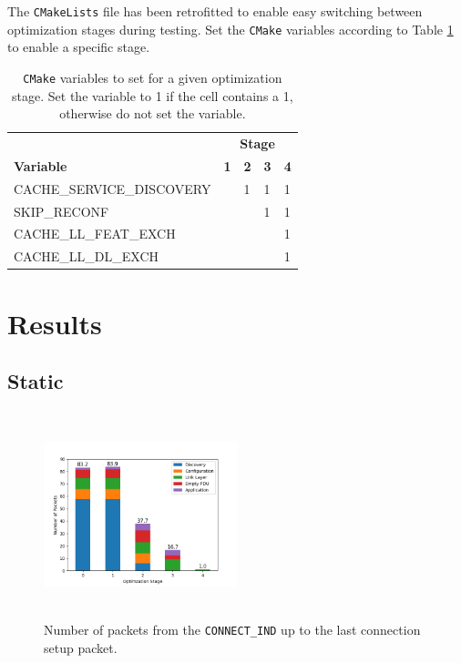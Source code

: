 The \texttt{CMakeLists} file has been retrofitted to enable easy switching between optimization stages during testing. Set the \texttt{CMake} variables according to Table \ref{tbl:stage_defs} to enable a specific stage.
\begin{table}
    \begin{center}
    \begin{tabular}{|l|l|l|l|l|}
        \hline
                                & \multicolumn{4}{c|}{\textbf{Stage}}   \\
        \textbf{Variable}    & \textbf{1} & \textbf{2} & \textbf{3} & \textbf{4} \\
        \hline
        CACHE\_SERVICE\_DISCOVERY &   & 1 & 1 & 1 \\
        \hline
        SKIP\_RECONF             &   &   & 1 & 1 \\
        \hline
        CACHE\_LL\_FEAT\_EXCH      &   &   &   & 1 \\
        \hline
        CACHE\_LL\_DL\_EXCH        &   &   &   & 1 \\
        \hline
    \end{tabular}
    \end{center}
    \caption{\texttt{CMake} variables to set for a given optimization stage. Set the variable to 1 if the cell contains a 1, otherwise do not set the variable.}
    \label{tbl:stage_defs}
\end{table}

\section{Results}
\label{sec:evaluation_results}

\subsection{Static}
\label{sec:static_evaluation}
\begin{figure}[]
    \centering
    \includegraphics[width=0.5\textwidth,height=6cm,keepaspectratio=true]{plots/static_packet_division.png}
    \caption{
        Number of packets from the \texttt{CONNECT\_IND} up to the last connection setup packet.
    }
    \label{fig:static_packet_division}
\end{figure}

